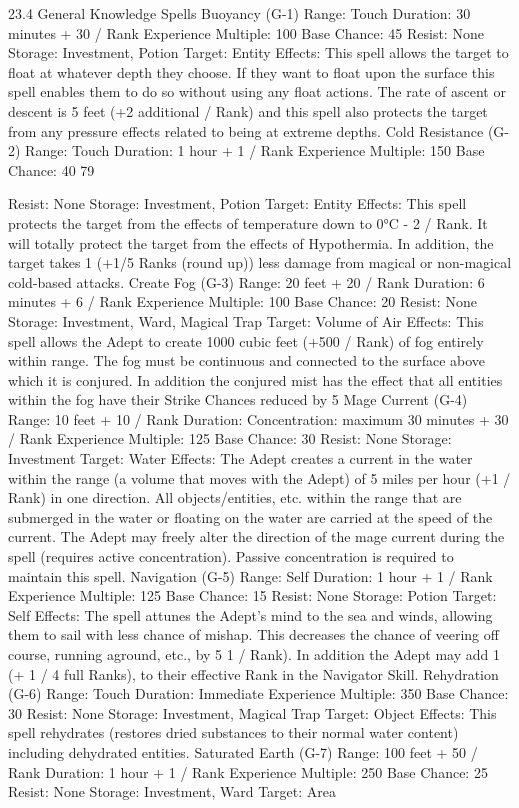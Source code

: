 \documentclass[a4paper]{article}
\begin{document}
\begin{multicols}{3}
23.4 General Knowledge Spells
Buoyancy (G-1)
Range: Touch
Duration: 30 minutes + 30 / Rank
Experience Multiple: 100
Base Chance: 45%
Resist: None
Storage: Investment, Potion
Target: Entity
Effects: This spell allows the target to float at
whatever depth they choose. If they want to float
upon the surface this spell enables them to do so
without using any float actions. The rate of ascent
or descent is 5 feet (+2 additional / Rank) and this
spell also protects the target from any pressure
effects related to being at extreme depths.
Cold Resistance (G-2)
Range: Touch
Duration: 1 hour + 1 / Rank
Experience Multiple: 150
Base Chance: 40%
79

Resist: None
Storage: Investment, Potion
Target: Entity
Effects: This spell protects the target from the
effects of temperature down to 0°C - 2 / Rank. It
will totally protect the target from the effects of
Hypothermia. In addition, the target takes 1 (+1/5
Ranks (round up)) less damage from magical or
non-magical cold-based attacks.
Create Fog (G-3)
Range: 20 feet + 20 / Rank
Duration: 6 minutes + 6 / Rank
Experience Multiple: 100
Base Chance: 20%
Resist: None
Storage: Investment, Ward, Magical Trap
Target: Volume of Air
Effects: This spell allows the Adept to create 1000
cubic feet (+500 / Rank) of fog entirely within
range. The fog must be continuous and connected
to the surface above which it is conjured. In addition the conjured mist has the effect that all entities
within the fog have their Strike Chances reduced
by 5%
Mage Current (G-4)
Range: 10 feet + 10 / Rank
Duration: Concentration: maximum 30 minutes +
30 / Rank
Experience Multiple: 125
Base Chance: 30%
Resist: None
Storage: Investment
Target: Water
Effects: The Adept creates a current in the water
within the range (a volume that moves with the
Adept) of 5 miles per hour (+1 / Rank) in one
direction. All objects/entities, etc. within the range
that are submerged in the water or floating on the
water are carried at the speed of the current. The
Adept may freely alter the direction of the mage
current during the spell (requires active concentration). Passive concentration is required to maintain
this spell.
Navigation (G-5)
Range: Self
Duration: 1 hour + 1 / Rank
Experience Multiple: 125
Base Chance: 15%
Resist: None
Storage: Potion
Target: Self
Effects: The spell attunes the Adept’s mind to the
sea and winds, allowing them to sail with less
chance of mishap. This decreases the chance of
veering off course, running aground, etc., by 5%
1 / Rank). In addition the Adept may add 1 (+ 1 / 4
full Ranks), to their effective Rank in the Navigator Skill.
Rehydration (G-6)
Range: Touch
Duration: Immediate
Experience Multiple: 350
Base Chance: 30%
Resist: None
Storage: Investment, Magical Trap
Target: Object
Effects: This spell rehydrates (restores dried substances to their normal water content) including
dehydrated entities.
Saturated Earth (G-7)
Range: 100 feet + 50 / Rank
Duration: 1 hour + 1 / Rank
Experience Multiple: 250
Base Chance: 25%
Resist: None
Storage: Investment, Ward
Target: Area


\end{multicols}
\end{document}

